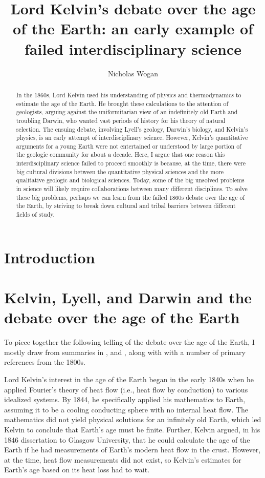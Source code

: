 \documentclass[12pt]{article}
\begin{document}
\title{Lord Kelvin's debate over the age of the Earth: an early example of failed interdisciplinary science}
\author{Nicholas Wogan}
\maketitle

\begin{abstract}
  In the 1860s, Lord Kelvin used his understanding of physics and thermodynamics to estimate the age of the Earth. He brought these calculations to the attention of geologists, arguing against the uniformitarian view of an indefinitely old Earth and troubling Darwin, who wanted vast periods of history for his theory of natural selection. The ensuing debate, involving Lyell's geology, Darwin's biology, and Kelvin's physics, is an early attempt of interdisciplinary science. However, Kelvin's quantitative arguments for a young Earth were not entertained or understood by large portion of the geologic community for about a decade. Here, I argue that one reason this interdisciplinary science failed to proceed smoothly is because, at the time, there were big cultural divisions between the quantitative physical sciences and the more qualitative geologic and biological sciences. Today, some of the big unsolved problems in science will likely require collaborations between many different disciplines. To solve these big problems, perhaps we can learn from the failed 1860s debate over the age of the Earth, by striving to break down cultural and tribal barriers between different fields of study.
\end{abstract}

\section{Introduction}

\section{Kelvin, Lyell, and Darwin and the debate over the age of the Earth}

To piece together the following telling of the debate over the age of the Earth, I mostly draw from summaries in \citet{Lindley_2004}, \citet{Gould_1987} and \citet{Hallam_1989}, along with with a number of primary references from the 1800s.

Lord Kelvin's interest in the age of the Earth began in the early 1840s when he applied Fourier's theory of heat flow (i.e., heat flow by conduction) to various idealized systems. By 1844, he specifically applied his mathematics to Earth, assuming it to be a cooling conducting sphere with no internal heat flow. The mathematics did not yield physical solutions for an infinitely old Earth, which led Kelvin to conclude that Earth's age must be finite. Further, Kelvin argued, in his 1846 dissertation to Glasgow University, that he could calculate the age of the Earth if he had measurements of Earth's modern heat flow in the crust. However, at the time, heat flow measurements did not exist, so Kelvin's estimates for Earth's age based on its heat loss had to wait.
\end{document}
